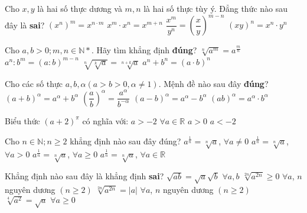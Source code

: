 \begin{ex}%
	Cho $x,y$ là hai số thực dương và $m,n$ là hai số thực tùy ý. Đẳng thức nào sau đây là \textbf{sai}?
	\choice
	{$(x^n)^m=x^{n\cdot m}$}
	{$x^m\cdot x^n=x^{m+n}$}
	{\True $\dfrac{x^m}{y^n}=\left(\dfrac{x}{y}\right)^{m-n}$}
	{$(xy)^n=x^n\cdot y^n$}
\end{ex}
\begin{ex}%
	Cho $a, b>0; m, n\in \mathbb{N}*$. Hãy tìm khẳng định \textbf{đúng}?
	\choice
	{$\sqrt[n]{a^m}=a^{\tfrac{m}{n}}$}
	{$a^n\colon b^m=(a\colon b)^{m-n}$}
	{$\sqrt[n]{\sqrt[k]{a}}=\sqrt[n+k]{a}$}
	{$a^n+b^n=(a\cdot b)^n$}
\end{ex}
\begin{ex}%
	Cho các số thực $a,b,\alpha\left(a>b>0,\alpha\neq 1\right)$. Mệnh đề nào sau đây \textbf{đúng}?
	\choice
	{$(a+b)^{\alpha}=a^{\alpha}+b^{\alpha}$}
	{$\left(\dfrac{a}{b}\right)^{\alpha}=\dfrac{a^{\alpha}}{b^{-\alpha}}$}
	{$(a-b)^{\alpha}=a^{\alpha}-b^{\alpha}$}
	{\True $(ab)^{\alpha}=a^{\alpha}\cdot b^{\alpha}$}
\end{ex}
\begin{ex}%
	Biểu thức $(a+2)^{\pi}$ có nghĩa với: 
	\choice
	{\True $a >-2$}
	{$\forall a\in\mathbb{R}$}
	{$a>0$}
	{$a <-2$}
\end{ex}
\begin{ex}%
	Cho $n\in \mathbb{N};n\geq 2$ khẳng định nào sau đây đúng?
	\choice
	{$a^{\tfrac{1}{n}}=\sqrt[n]{a}$, $\forall a\neq 0$}
	{\True $a^{\tfrac{1}{n}}=\sqrt[n]{a}$, $\forall a>0$}
	{$a^{\tfrac{1}{n}}=\sqrt[n]{a}$, $\forall a\geq 0$}
	{$a^{\tfrac{1}{n}}=\sqrt[n]{a}$, $\forall a\in\mathbb{R}$}
\end{ex}
\begin{ex}%
	Khẳng định nào sau đây là khẳng định \textbf{sai}?
	\choice
	{\True $\sqrt{ab}=\sqrt{a}\sqrt{b}\,\,\forall a,b$}
	{$\sqrt[2n]{a^{2n}}\geq 0 \,\,\forall a$, $n$ nguyên dương $(n\geq 2)$}
	{$\sqrt[2n]{a^{2n}}=|a|\,\,\forall a$, $n$ nguyên dương $(n\geq 2)$}
	{$\sqrt[4]{a^2}=\sqrt{a}\,\,\forall a\geq 0$}
\end{ex}

